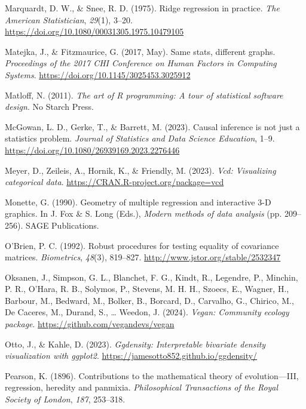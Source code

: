 \documentclass[
  letterpaper,
  10pt,
  krantz2]{krantz}
\newlength{\cslhangindent}
\newenvironment{CSLReferences}[2] %
 {\begin{list}{}{%
  \setlength{\itemindent}{0pt}
  \setlength{\leftmargin}{0pt}
  \setlength{\parsep}{0pt}
  \ifodd #1
   \setlength{\leftmargin}{\cslhangindent}
   \setlength{\itemindent}{-1\cslhangindent}
  \fi
  \setlength{\itemsep}{#2\baselineskip}}}
 {\end{list}}
\begin{document}
{\begin{CSLReferences}{1}{0}
Marquardt, D. W., \& Snee, R. D. (1975). Ridge regression in practice.
\emph{The American Statistician}, \emph{29}(1), 3--20.
\url{https://doi.org/10.1080/00031305.1975.10479105}

Matejka, J., \& Fitzmaurice, G. (2017, May). Same stats, different
graphs. \emph{Proceedings of the 2017 {CHI} Conference on Human Factors
in Computing Systems}. \url{https://doi.org/10.1145/3025453.3025912}

Matloff, N. (2011). \emph{The art of {R} programming: {A} tour of
statistical software design}. No Starch Press.

McGowan, L. D., Gerke, T., \& Barrett, M. (2023). Causal inference is
not just a statistics problem. \emph{Journal of Statistics and Data
Science Education}, 1--9.
\url{https://doi.org/10.1080/26939169.2023.2276446}

Meyer, D., Zeileis, A., Hornik, K., \& Friendly, M. (2023). \emph{Vcd:
Visualizing categorical data}.
\url{https://CRAN.R-project.org/package=vcd}

Monette, G. (1990). Geometry of multiple regression and interactive
3-{D} graphics. In J. Fox \& S. Long (Eds.), \emph{Modern methods of
data analysis} (pp. 209--256). SAGE Publications.

O'Brien, P. C. (1992). Robust procedures for testing equality of
covariance matrices. \emph{Biometrics}, \emph{48}(3), 819--827.
\url{http://www.jstor.org/stable/2532347}

Oksanen, J., Simpson, G. L., Blanchet, F. G., Kindt, R., Legendre, P.,
Minchin, P. R., O'Hara, R. B., Solymos, P., Stevens, M. H. H., Szoecs,
E., Wagner, H., Barbour, M., Bedward, M., Bolker, B., Borcard, D.,
Carvalho, G., Chirico, M., De Caceres, M., Durand, S., \ldots{} Weedon,
J. (2024). \emph{Vegan: Community ecology package}.
\url{https://github.com/vegandevs/vegan}

Otto, J., \& Kahle, D. (2023). \emph{Ggdensity: Interpretable bivariate
density visualization with ggplot2}.
\url{https://jamesotto852.github.io/ggdensity/}

Pearson, K. (1896). Contributions to the mathematical theory of
evolution---{III}, regression, heredity and panmixia.
\emph{Philosophical Transactions of the Royal Society of London},
\emph{187}, 253--318.


\end{CSLReferences}}
\end{document}
